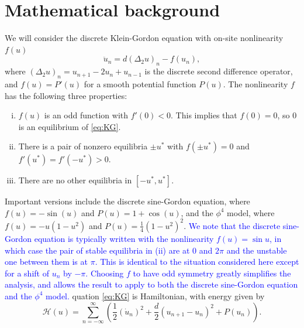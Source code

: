 \documentclass[12pt,reqno]{amsart}
\newcommand{\revisedd}[2]{ \textcolor{blue}{#1} }
\begin{document}
\section{Mathematical background}\label{sec:bg}

We will consider the discrete Klein-Gordon equation with on-site nonlinearity $f(u)$
\begin{equation}\label{eq:KG}
\ddot{u}_n = d (\Delta_2 u)_n - f(u_n),
\end{equation}
where $(\Delta_2 u)_n = u_{n+1} - 2 u_n + u_{n-1}$ is the discrete second difference operator, and $f(u) = P'(u)$ for a smooth potential function $P(u)$. The nonlinearity $f$ has the following three properties:
\begin{enumerate}[(i)]
	\item {$f(u)$ is an odd function with $f'(0) < 0$. This implies that $f(0) = 0$, so 0 is an equilibrium of \cref{eq:KG}.}
	\item There is a pair of nonzero equilibria $\pm u^*$ with $f(\pm u^*) = 0$ and $f'(u^*) = f'(-u^*) > 0$.
	\item There are no other equilibria in $[-u^*, u^*]$.
\end{enumerate}
Important versions include the discrete sine-Gordon equation, where $f(u) = -\sin(u)$ and $P(u) = 1 + \cos(u)$, and the $\phi^4$ model, where $f(u) = -u(1-u^2)$ and $P(u) = \frac{1}{4}(1-u^2)^2$.
\revisedd{We note that the discrete sine-Gordon equation is typically written with the nonlinearity $f(u) = \sin u$, in which case the pair of stable
equilibria in (ii) are at 0 and $2 \pi$ and the unstable one between them
is at $\pi$. This is identical to the situation considered here except for a shift of $u_n$ by $-\pi$. Choosing $f$ to have odd symmetry greatly simplifies the analysis, and allows the result to apply to both the discrete sine-Gordon equation and the $\phi^4$ model.}
Equation \cref{eq:KG} is Hamiltonian, with energy given by \cite{KevrekidisWeinstein2000}
\begin{equation}\label{eq:H}
	\mathcal{H}(u) = \sum_{n=-\infty}^\infty 
	\left( \frac{1}{2} (\dot{u}_n)^2 + \frac{d}{2} (u_{n+1} - u_n)^2 + P(u_n) \right).
\end{equation}
\end{document}
